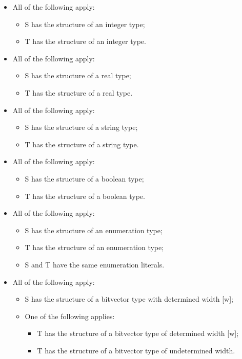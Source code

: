 \documentclass{book}
\begin{document}
  \begin{itemize}
  \item  All of the following apply:
    \begin{itemize}
    \item  S has the structure of an integer type;
    \item  T has the structure of an integer type.
    \end{itemize}

  \item  All of the following apply:
    \begin{itemize}
    \item  S has the structure of a real type;
    \item  T has the structure of a real type.
    \end{itemize} 

  \item  All of the following apply:
    \begin{itemize}
    \item  S has the structure of a string type;
    \item  T has the structure of a string type.
    \end{itemize}

  \item  All of the following apply:
    \begin{itemize}
    \item  S has the structure of a boolean type;
    \item  T has the structure of a boolean type.
    \end{itemize}

  \item  All of the following apply:
    \begin{itemize}
    \item  S has the structure of an enumeration type; 
    \item  T has the structure of an enumeration type;
    \item  S and T have the same enumeration literals.
    \end{itemize}

  \item  All of the following apply:
    \begin{itemize}
    \item  S has the structure of a bitvector type with determined width [w];
    \item  One of the following applies:
      \begin{itemize}
      \item  T has the structure of a bitvector type of determined width [w];
      \item  T has the structure of a bitvector type of undetermined width.
      \end{itemize}
    \end{itemize}


\end{itemize}
\end{document}
